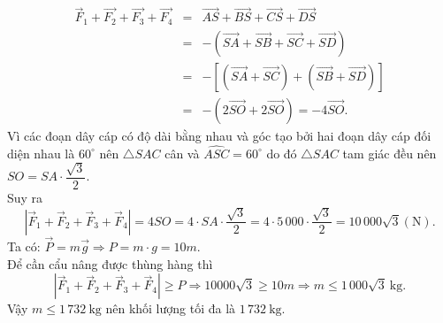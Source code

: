 \begin{bt}
{\begin{eqnarray*}
			 \overrightarrow{F}_{1}+\overrightarrow{F_{2}}+\overrightarrow{F_{3}}+\overrightarrow{F_{4}}
			&=& \overrightarrow{A S}+\overrightarrow{B  S}+\overrightarrow{C S}+\overrightarrow{D S}\\
			&=&-  \left(\overrightarrow{S A}+\overrightarrow{S B}+\overrightarrow{S C}+\overrightarrow{S D}\right)\\
			&=& -\left[\left(\overrightarrow{S A}+\overrightarrow{S  C}\right)+\left(\overrightarrow{S B}+\overrightarrow{S D}\right)\right]\\
			&=&- \left(2 \overrightarrow{S O}+2 \overrightarrow{S O}\right)=-4  \overrightarrow{S O}.
		\end{eqnarray*}
		Vì các  đoạn dây cáp có độ dài bằng nhau và góc tạo bởi hai đoạn dây cáp đối diện nhau là $60^{\circ}$ nên $\triangle SAC$ cân và $\widehat{ASC}=60^{\circ}$ do đó $\triangle SAC$ tam giác đều nên $SO = SA \cdot \dfrac{\sqrt{3}}{2}$.\\
		Suy  ra
		\[\left|\overrightarrow{F}_{1}+\overrightarrow{F}_{2}+\overrightarrow{F}_{3}+\overrightarrow{F}_{4}\right|=4 S  O=4 \cdot S A \cdot \dfrac{\sqrt{3}}{2}=4 \cdot 5\,000 \cdot \dfrac{\sqrt{3}}{2}=10\,000 \sqrt{3} (\mathrm{N}).\]
		Ta có:  $\overrightarrow{P}=m \overrightarrow{g} \Rightarrow P=m \cdot g=10 m$.\\
		Để cần  cẩu nâng được thùng hàng thì
		\[\left|\overrightarrow{F}_{1}+\overrightarrow{F}_{2}+\overrightarrow{F}_{3}+\overrightarrow{F}_{4}\right| \geq P \Rightarrow 10000 \sqrt{3} \geq 10  m \Rightarrow m \leq 1\,000 \sqrt{3} \mathrm{~kg}.\]
		 Vậy $m \leq 1\,732 \mathrm{~kg}$ nên khối lượng tối đa là $1\,732 \mathrm{~kg}$.
	} 
\end{bt}

